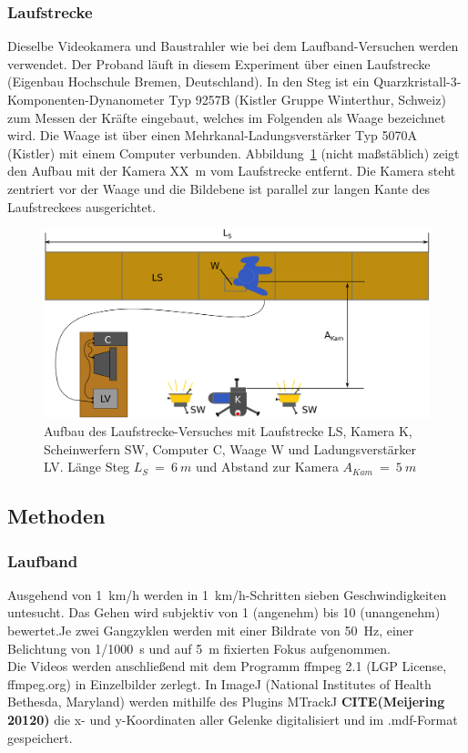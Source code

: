 \subsubsection{Laufstrecke}
Dieselbe Videokamera und Baustrahler wie bei dem Laufband-Versuchen werden verwendet. Der Proband läuft in diesem Experiment über einen Laufstrecke (Eigenbau Hochschule Bremen, Deutschland). In den Steg ist ein Quarzkristall-3-Komponenten-Dynanometer Typ 9257B (Kistler Gruppe Winterthur, Schweiz) zum Messen der Kräfte eingebaut, welches im Folgenden als Waage bezeichnet wird. Die Waage ist über einen Mehrkanal-Ladungsverstärker Typ 5070A (Kistler) mit einem Computer verbunden. Abbildung~\ref{fig:laufstg_stp} (nicht maßstäblich) zeigt den Aufbau mit der Kamera XX~m vom Laufstrecke entfernt. Die Kamera steht zentriert vor der Waage und die Bildebene ist parallel zur langen Kante des Laufstreckees ausgerichtet.

\begin{figure}[h!]
	\centering
	\includegraphics[width=0.7\linewidth]{bilder/mat_met/Laufstrecke_setup}
	\caption[Aufbau Laufstrecke Versuch]{Aufbau des Laufstrecke-Versuches mit Laufstrecke LS, Kamera K, Scheinwerfern SW, Computer C, Waage W und Ladungsverstärker LV. Länge Steg $L_S~=~6~m$ und Abstand zur Kamera $A_{Kam}~=~5~m$}
	\label{fig:laufstg_stp}
\end{figure}

\subsection{Methoden}
\subsubsection{Laufband}
Ausgehend von 1~km/h werden in 1~km/h-Schritten sieben Geschwindigkeiten untesucht. Das Gehen wird subjektiv von 1 (angenehm) bis 10 (unangenehm) bewertet.Je zwei Gangzyklen werden mit einer Bildrate von 50~Hz, einer Belichtung von 1/1000~s und auf 5~m fixierten Fokus aufgenommen.\\
Die Videos werden anschließend mit dem Programm ffmpeg 2.1 (LGP License, ffmpeg.org) in Einzelbilder zerlegt. In ImageJ (National Institutes of Health Bethesda, Maryland) werden mithilfe des Plugins MTrackJ \textbf{CITE(Meijering 20120)} die x- und y-Koordinaten aller Gelenke digitalisiert und im .mdf-Format gespeichert.

